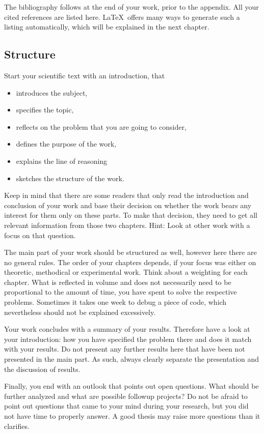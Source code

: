 The bibliography follows at the end of your work, prior to the appendix. All your cited references are listed here. \LaTeX\ offers many ways to generate
such a listing automatically, which will be explained in the next chapter.

\subsection{Structure}

Start your scientific text with an introduction, that
\begin{itemize}
    \item introduces the subject,
    \item specifies the topic,
    \item reflects on the problem that you are going to consider,
    \item defines the purpose of the work,
    \item explains the line of reasoning
    \item sketches the structure of the work.
\end{itemize}

Keep in mind that there are some readers that only read the introduction and conclusion of your work
and base their decision on whether the work bears any interest for them only on these parts. To make that decision,
they need to get all relevant information from those two chapters. Hint: Look at other work with a focus on that question.

The main part of your work should be structured as well, however here there are no general rules. The order of your
chapters depends, if your focus was either on theoretic, methodical or experimental work. Think about a weighting for each
chapter. What is reflected in volume and does not necessarily need to be proportional to the amount of time, you have 
spent to solve the respective problems. Sometimes it takes one week to debug a piece of code, which nevertheless should not be explained excessively.

Your work concludes with a summary of your results. Therefore have a look at your introduction: how you have specified the problem there and does it
match with your results. Do not present any further results here that have been not presented in the main part. As such, always clearly
separate the presentation and the discussion of results.

Finally, you end with an outlook that points out open questions. What should be further analyzed and what are possible followup projects?
Do not be afraid to point out questions that came to your mind during your research, but you did not have time to properly answer. 
A good thesis may raise more questions than it clarifies.